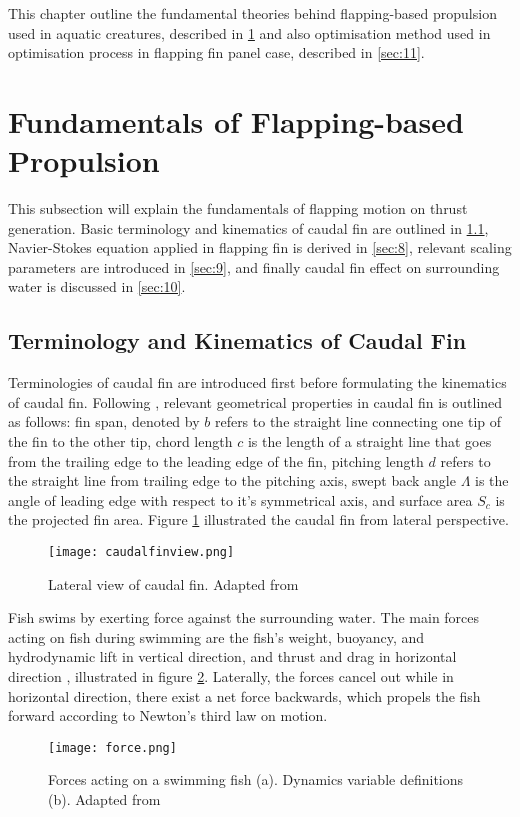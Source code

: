 This chapter outline the fundamental theories behind flapping-based propulsion used in aquatic creatures, described in \ref{sec:6} and also optimisation method used in optimisation process in flapping fin panel case, described in \ref{sec:11}.
\section{Fundamentals of Flapping-based Propulsion}
\label{sec:6}
This subsection will explain the fundamentals of flapping motion on thrust generation. Basic terminology and kinematics of caudal fin are outlined in \ref{sec:7}, Navier-Stokes equation applied in flapping fin is derived in \ref{sec:8}, relevant scaling parameters are introduced in \ref{sec:9}, and finally caudal fin effect on surrounding water is discussed in \ref{sec:10}.
\subsection{Terminology and Kinematics of Caudal Fin}
\label{sec:7}
Terminologies of caudal fin are introduced first before formulating the kinematics of caudal fin. Following \citet{sfakiotakis}, relevant geometrical properties in caudal fin is outlined as follows: fin span, denoted by $b$ refers to the straight line connecting one tip of the fin to the other tip, chord length $c$ is the length of a straight line that goes from the trailing edge to the leading edge of the fin, pitching length $d$ refers to the straight line from trailing edge to the pitching axis, swept back angle $\Lambda$ is the angle of leading edge with respect to it's symmetrical axis, and surface area $S_{c}$ is the projected fin area. Figure \ref{fig:caudalfinview} illustrated the caudal fin from lateral perspective.
\begin{figure}[H]
    \centering
    \texttt{[image: caudalfinview.png]}
    \caption{Lateral view of caudal fin. Adapted from \cite{magnuson}}
    \label{fig:caudalfinview}
\end{figure}
Fish swims by exerting force against the surrounding water. The main forces acting on fish during swimming are the fish's weight, buoyancy, and hydrodynamic lift in vertical direction, and thrust and drag in horizontal direction \citep{magnuson}, illustrated in figure \ref{fig:force}. Laterally, the forces cancel out while in horizontal direction, there exist a net force backwards, which propels the fish forward according to Newton's third law on motion.\par
\begin{figure}[H]
    \centering
    \texttt{[image: force.png]}
    \caption{Forces acting on a swimming fish (a). Dynamics variable definitions (b). Adapted from \citet{magnuson}}
    \label{fig:force}
\end{figure}
